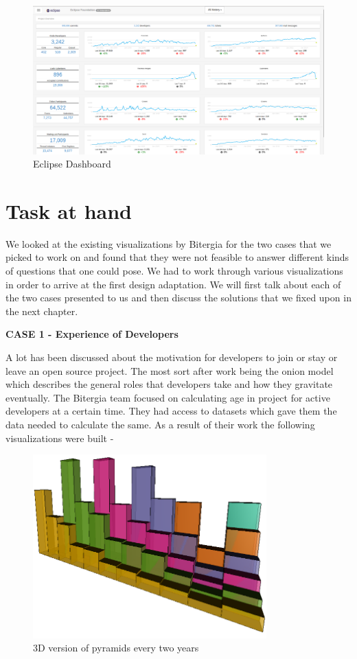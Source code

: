 \documentclass[seploa]{beavtex}
\begin{document}
\begin{figure}[H]
\centering
\includegraphics[width=120mm]{eclipse.png}
\caption{Eclipse Dashboard}
\end{figure}

\section{Task at hand}
We looked at the existing visualizations by Bitergia for the two cases that we picked to work on and found that they were not feasible to answer different kinds of questions that one could pose. We had to work through various visualizations in order to arrive at the first design adaptation. We will first talk about each of the two cases presented to us and then discuss the solutions that we fixed upon in the next chapter.

\textbf{CASE 1 - Experience of Developers}

A lot has been discussed about the motivation for developers to join or stay or leave an open source project. The most sort after work being the onion model which describes the general roles that developers take and how they gravitate eventually\cite{crowston2005,  kishida2003}. The Bitergia team focused on calculating age in project for active developers at a certain time. They had access to datasets which gave them the data needed to calculate the same. As a result of their work the following visualizations were built - 

\begin{figure}[!ht]
\centering
\includegraphics[width=90mm]{age2.png}
\caption{3D version of pyramids every two years}
\end{figure}
\end{document}
